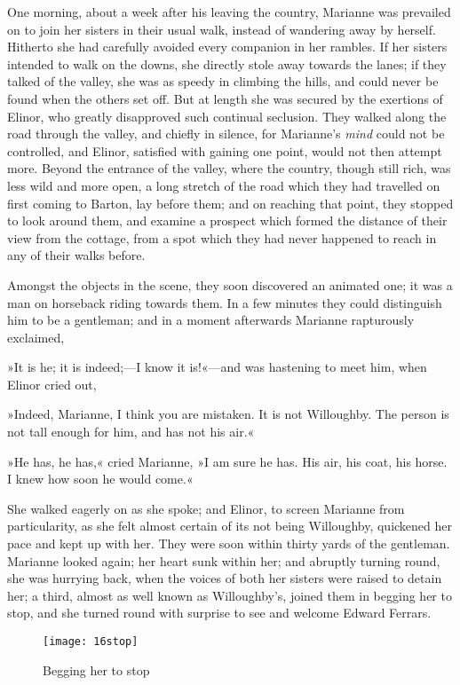 One morning, about a week after his leaving the country, Marianne was prevailed on to join her sisters in their usual walk, instead of wandering away by herself. Hitherto she had carefully avoided every companion in her rambles. If her sisters intended to walk on the downs, she directly stole away towards the lanes; if they talked of the valley, she was as speedy in climbing the hills, and could never be found when the others set off. But at length she was secured by the exertions of Elinor, who greatly disapproved such continual seclusion. They walked along the road through the valley, and chiefly in silence, for Marianne’s \textit{mind} could not be controlled, and Elinor, satisfied with gaining one point, would not then attempt more. Beyond the entrance of the valley, where the country, though still rich, was less wild and more open, a long stretch of the road which they had travelled on first coming to Barton, lay before them; and on reaching that point, they stopped to look around them, and examine a prospect which formed the distance of their view from the cottage, from a spot which they had never happened to reach in any of their walks before.

Amongst the objects in the scene, they soon discovered an animated one; it was a man on horseback riding towards them. In a few minutes they could distinguish him to be a gentleman; and in a moment afterwards Marianne rapturously exclaimed,

»It is he; it is indeed;—I know it is!«—and was hastening to meet him, when Elinor cried out,

»Indeed, Marianne, I think you are mistaken. It is not Willoughby. The person is not tall enough for him, and has not his air.«

»He has, he has,« cried Marianne, »I am sure he has. His air, his coat, his horse. I knew how soon he would come.«

She walked eagerly on as she spoke; and Elinor, to screen Marianne from particularity, as she felt almost certain of its not being Willoughby, quickened her pace and kept up with her. They were soon within thirty yards of the gentleman. Marianne looked again; her heart sunk within her; and abruptly turning round, she was hurrying back, when the voices of both her sisters were raised to detain her; a third, almost as well known as Willoughby’s, joined them in begging her to stop, and she turned round with surprise to see and welcome Edward Ferrars.

\begin{figure}[tbph]
\centering
\texttt{[image: 16stop]}
\caption{Begging her to stop}
\end{figure}

